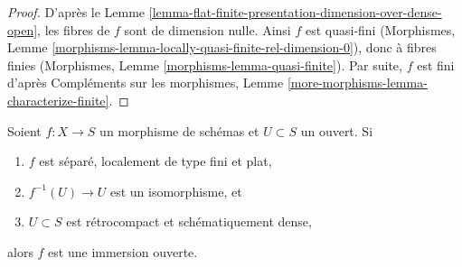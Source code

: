 \begin{proof}
D'après le Lemme \ref{lemma-flat-finite-presentation-dimension-over-dense-open},
les fibres de $f$ sont de dimension nulle.
Ainsi $f$ est quasi-fini
(Morphismes, Lemme \ref{morphisms-lemma-locally-quasi-finite-rel-dimension-0}),
donc à fibres finies
(Morphismes, Lemme \ref{morphisms-lemma-quasi-finite}).
Par suite, $f$ est fini d'après
Compléments sur les morphismes, Lemme \ref{more-morphisms-lemma-characterize-finite}.
\end{proof}

\begin{lemma}
\label{lemma-zariski}
Soient $f : X \to S$ un morphisme de schémas et $U \subset S$ un ouvert. Si
\begin{enumerate}
\item $f$ est séparé, localement de type fini et plat,
\item $f^{-1}(U) \to U$ est un isomorphisme, et
\item $U \subset S$ est rétrocompact et schématiquement dense,
\end{enumerate}
alors $f$ est une immersion ouverte.
\end{lemma}

